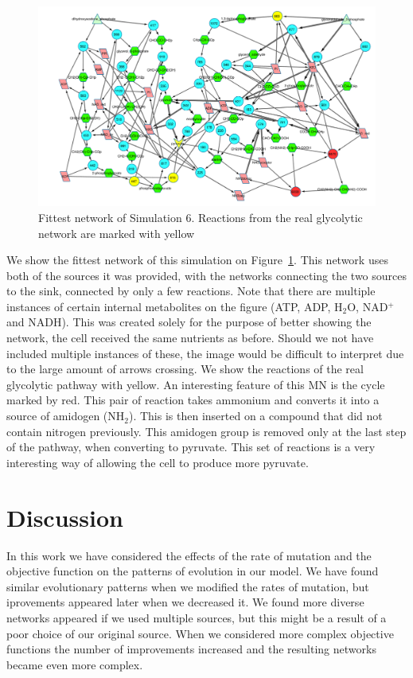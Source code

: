 \documentclass[a4paper,12pt]{article}
\begin{document}
\begin{figure}[htpb]
	\centering
	\includegraphics[width=1\linewidth]{sim6network.pdf}
	\caption{Fittest network of Simulation 6. Reactions from the real glycolytic network are marked with yellow}
	\label{fig:sim6network}
\end{figure}

We show the fittest network of this simulation on Figure~\ref{fig:sim6network}. This network uses both of the sources it was provided, with the networks connecting the two sources to the sink, connected by only a few reactions. Note that there are multiple instances of certain internal metabolites on the figure (ATP, ADP, H$_2$O, NAD$^+$ and NADH). This was created solely for the purpose of better showing the network, the cell received the same nutrients as before. Should we not have included multiple instances of these, the image would be difficult to interpret due to the large amount of arrows crossing. We show the reactions of the real glycolytic pathway with yellow. An interesting feature of this MN is the cycle marked by red. This pair of reaction takes ammonium and converts it into a source of amidogen (NH$_2$). This is then inserted on a compound that did not contain nitrogen previously. This amidogen group is removed only at the last step of the pathway, when converting to pyruvate. This set of reactions is a very interesting way of allowing the cell to produce more pyruvate. 


\section{Discussion}
\label{sec:discussion}

In this work we have considered the effects of the rate of mutation and the objective function on the patterns of evolution in our model. We have found similar evolutionary patterns when we modified the rates of mutation, but iprovements appeared later when we decreased it. We found more diverse networks appeared if we used multiple sources, but this might be a result of a poor choice of our original source. When we considered more complex objective functions the number of improvements increased and the resulting networks became even more complex. 
\end{document}
